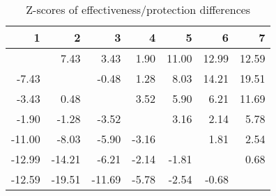 \begin{table}[ht]
\centering
\begin{tabular}{rrrrrrr}
  \hline
1 & 2 & 3 & 4 & 5 & 6 & 7 \\ 
  \hline
 & 7.43 & 3.43 & 1.90 & 11.00 & 12.99 & 12.59 \\ 
  -7.43 &  & -0.48 & 1.28 & 8.03 & 14.21 & 19.51 \\ 
  -3.43 & 0.48 &  & 3.52 & 5.90 & 6.21 & 11.69 \\ 
  -1.90 & -1.28 & -3.52 &  & 3.16 & 2.14 & 5.78 \\ 
  -11.00 & -8.03 & -5.90 & -3.16 &  & 1.81 & 2.54 \\ 
  -12.99 & -14.21 & -6.21 & -2.14 & -1.81 &  & 0.68 \\ 
  -12.59 & -19.51 & -11.69 & -5.78 & -2.54 & -0.68 &  \\ 
   \hline
\end{tabular}
\caption{Z-scores of effectiveness/protection differences} 
\end{table}
